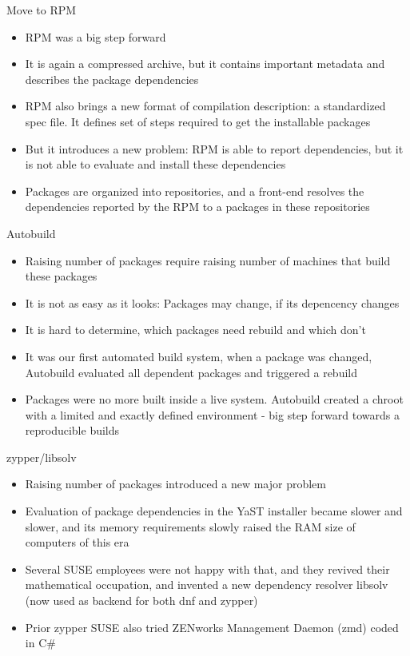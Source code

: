 \documentclass{beamer}
\begin{document}
\begin{frame}[t]{Move to RPM}
	\begin{itemize}
	\item RPM was a big step forward
	\item It is again a compressed archive, but it contains important metadata and describes the package dependencies
	\item RPM also brings a new format of compilation description: a standardized spec file. It defines set of steps required to get the installable packages
	\item But it introduces a new problem: RPM is able to report dependencies, but it is not able to evaluate and install these dependencies
	\item Packages are organized into repositories, and a front-end resolves the dependencies reported by the RPM to a packages in these repositories
	\end{itemize}
\end{frame}

\begin{frame}[t]{Autobuild}
	\begin{itemize}
	\item Raising number of packages require raising number of machines that build these packages
	\item It is not as easy as it looks: Packages may change, if its depencency changes
	\item It is hard to determine, which packages need rebuild and which don't
	\item It was our first automated build system, when a package was changed, Autobuild evaluated all dependent packages and triggered a rebuild
	\item Packages were no more built inside a live system. Autobuild created a chroot with a limited and exactly defined environment - big step forward towards a reproducible builds
	\end{itemize}
\end{frame}

\begin{frame}[t]{zypper/libsolv}
        \begin{itemize}
        \item Raising number of packages introduced a new major problem
        \item Evaluation of package dependencies in the YaST installer became slower and slower, and its memory requirements slowly raised the RAM size of computers of this era
        \item Several SUSE employees were not happy with that, and they revived their mathematical occupation, and invented a new dependency resolver libsolv (now used as backend for both dnf and zypper)
        \item Prior zypper SUSE also tried ZENworks Management Daemon (zmd) coded in C#
        \end{itemize}
\end{frame}
\end{document}
